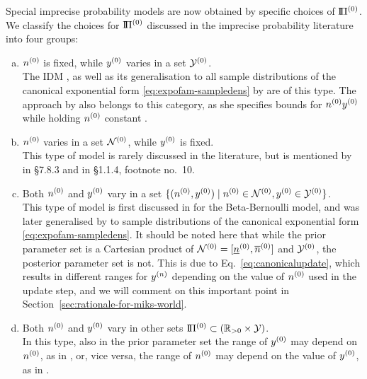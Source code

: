 Special imprecise probability models are now obtained by specific choices of $\text{I}\!\Pi^{(0)}$.
We classify the choices for $\text{I}\!\Pi^{(0)}$ discussed in the imprecise probability literature into four groups:
\begin{enumerate}[(a)]
\item $n^{(0)}$ is fixed, while $y^{(0)}$ varies in a set $\mathcal{Y}^{(0)}$.\\
\label{enum:modeltypes-a}%
The IDM \cite{1996:walley::idm},
as well as its generalisation to all sample distributions of the canonical exponential form \eqref{eq:expofam-sampledens}
by \cite{2005:quaeghebeurcooman} are of this type.
The approach by \cite{1997:boratynska} also belongs to this category,
as she specifies bounds for $n^{(0)} y^{(0)}$ while holding $n^{(0)}$ constant \cite[see][p.~1973]{2012:benavolizaffalon}.
\item $n^{(0)}$ varies in a set $\mathcal{N}^{(0)}$, while $y^{(0)}$ is fixed.\\
\label{enum:varyn}%
This type of model is rarely discussed in the literature,
but is mentioned by \cite{1991:walley} in {\S 7.8.3} and in {\S 1.1.4}, footnote no.~10.
\item Both $n^{(0)}$ and $y^{(0)}$ vary in a set $\{ (n^{(0)}, y^{(0)}) \mid n^{(0)} \in \mathcal{N}^{(0)}, y^{(0)} \in \mathcal{Y}^{(0)} \}$.\\
\label{enum:rectangular}%
This type of model is first discussed in \cite[\S 5.4.3]{1991:walley} for the Beta-Bernoulli model,
and was later generalised by \cite{Walter2009a-long}
to sample distributions of the canonical exponential form \eqref{eq:expofam-sampledens}.
It should be noted here that while the prior parameter set is a Cartesian product of $\mathcal{N}^{(0)} = [\underline{n}^{(0)}, \overline{n}^{(0)}]$ and $\mathcal{Y}^{(0)}$,
the posterior parameter set is not.
This is due to Eq.~\eqref{eq:canonicalupdate},
which results in different ranges for $y^{(n)}$ depending on the value of $n^{(0)}$ used in the update step,
and we will comment on this important point in Section~\ref{sec:rationale-for-miks-world}.
\item Both $n^{(0)}$ and $y^{(0)}$ vary in other sets $\text{I}\!\Pi^{(0)} \subset (\mathbb{R}_{>0} \times \mathcal{Y})$.\\
\label{enum:generalset}%
In this type, also in the prior parameter set the range of $y^{(0)}$ may depend on $n^{(0)}$,
as in \cite[\S 2.3]{Walter2011a},
or, vice versa, the range of $n^{(0)}$ may depend on the value of $y^{(0)}$, as in \cite{2012:benavolizaffalon}.
\end{enumerate}

